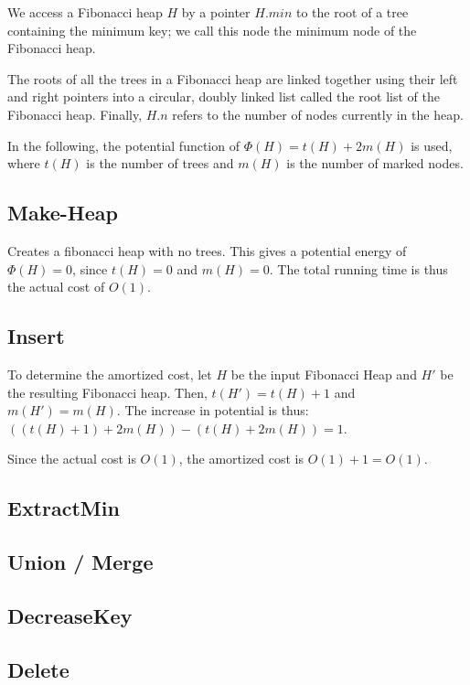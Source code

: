 We access a Fibonacci heap $H$ by a pointer $H.min$ to the
root of a tree containing the minimum key; we call this node the
minimum node of the Fibonacci heap.

The roots of all the trees in a Fibonacci heap are linked
together using their left and right pointers into a circular,
doubly linked list called the root list of the Fibonacci heap.
Finally, $H.n$ refers to the number of nodes currently in the heap.

In the following, the potential function of $\Phi(H) = t(H) + 2m(H)$ is used,
where $t(H)$ is the number of trees and $m(H)$ is the number of marked nodes.

\subsection{Make-Heap}
Creates a fibonacci heap with no trees. This gives a potential energy of
$\Phi(H) = 0$, since $t(H)=0$ and $m(H)=0$. The total running time is thus the
actual cost of $O(1)$.

\subsection{Insert}
To determine the amortized cost, let $H$ be the input Fibonacci Heap
and $H'$ be the resulting Fibonacci heap. Then, $t(H')=t(H)+1$ and
$m(H')=m(H)$. The increase in potential is thus: $((t(H)+1) + 2m(H)) - (t(H) + 2m(H)) = 1$.

Since the actual cost is $O(1)$, the amortized cost is $O(1) + 1 = O(1)$.
\subsection{ExtractMin}
\subsection{Union / Merge}
\subsection{DecreaseKey}
\subsection{Delete}
